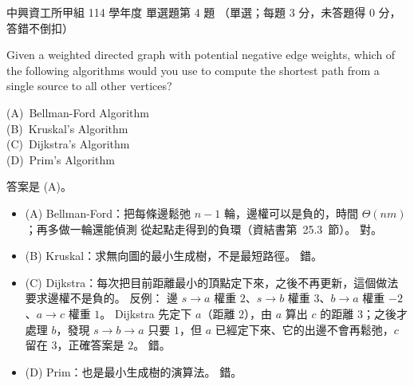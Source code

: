 \begin{pastexam}[label={px:nchu-114-dsa-04}]{中興資工所甲組 114 學年度 單選題第 4 題}
（單選；每題 3 分，未答題得 0 分，答錯不倒扣）

Given a weighted directed graph with potential negative edge weights, which of the following algorithms would you use to compute the shortest path from a single source to all other vertices?

(A)~Bellman-Ford Algorithm\\
(B)~Kruskal's Algorithm\\
(C)~Dijkstra's Algorithm\\
(D)~Prim's Algorithm
\end{pastexam}

\begin{pastsoln}
答案是 (A)。

\begin{itemize}
\item (A) Bellman-Ford：把每條邊鬆弛 $n - 1$ 輪，邊權可以是負的，時間 $\Theta(nm)$；再多做一輪還能偵測
從起點走得到的負環（資結書第~25.3~節）。 對。
\item (B) Kruskal：求無向圖的最小生成樹，不是最短路徑。 錯。
\item (C) Dijkstra：每次把目前距離最小的頂點定下來，之後不再更新，這個做法要求邊權不是負的。 反例：
邊 $s \to a$ 權重 $2$、$s \to b$ 權重 $3$、$b \to a$ 權重 $-2$、$a \to c$ 權重 $1$。 Dijkstra 先定下
$a$（距離 $2$），由 $a$ 算出 $c$ 的距離 $3$；之後才處理 $b$，發現 $s \to b \to a$ 只要 $1$，但 $a$
已經定下來、它的出邊不會再鬆弛，$c$ 留在 $3$，正確答案是 $2$。 錯。
\item (D) Prim：也是最小生成樹的演算法。 錯。
\end{itemize}
\end{pastsoln}
